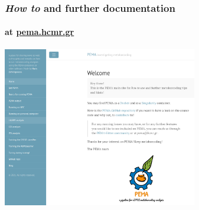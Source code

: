\documentclass{beamer}
\begin{document}
\begin{frame}
\begin{singlespace}
\begin{textblock*}{5cm}
         \end{textblock*}


      \end{singlespace}
   \end{frame}

   \begin{frame}
      \frametitle{\textit{How to} and further documentation}
      \framesubtitle{at \href{http://pema.hcmr.gr}{pema.hcmr.gr}}
      \includegraphics[width=85mm]{resources/pema_site.png}
   \end{frame}
   \fi 
\end{document}
